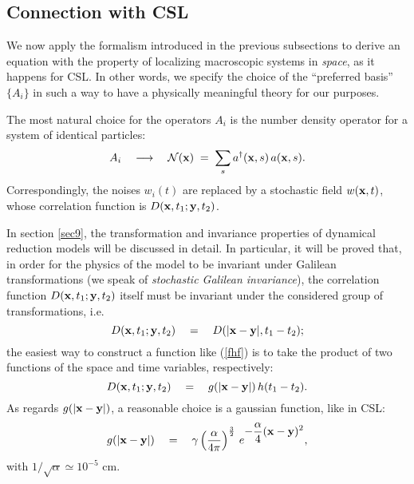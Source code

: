 \documentclass[10pt,a4paper]{article}
\begin{document}
\subsection{Connection with CSL} \label{nsec5}

We now apply the formalism introduced in the previous subsections
to derive an equation with the property of localizing macroscopic
systems in {\it space}, as it happens for CSL. In other words, we specify
the choice of the ``preferred basis'' $\{ A_{i} \}$ in such a way
to have a physically meaningful theory for our purposes.

The most natural choice for the operators $A_{i}$ is the number
density operator for a system of identical particles:
\begin{equation}
A_{i} \quad \longrightarrow \quad {\mathcal N}({\bf x}) \; = \;
\sum_{s} a^{\dagger}({\bf x}, s)\,a({\bf x}, s).
\end{equation}
Correspondingly, the noises $w_{i}(t)$ are replaced by a
stochastic field $w({\bf x}, t)$, whose correlation function is
$D({\bf x}, t_{1}; {\bf y}, t_{2})$.

In section \ref{sec9}, the transformation and invariance
properties of dynamical reduction models will be discussed in
detail. In particular, it will be proved that, in order for the
physics of the model to be invariant under Galilean
transformations (we speak of {\it stochastic Galilean
invariance}), the correlation function $D({\bf x}, t_{1}; {\bf y},
t_{2})$ itself must be invariant under the considered group of
transformations, i.e.
\begin{equation} \label{fhf}
D({\bf x}, t_{1}; {\bf y}, t_{2}) \quad = \quad D(|{\bf x} - {\bf
y}|, t_{1}- t_{2});
\end{equation}
the easiest way to construct a function like (\ref{fhf}) is to
take the product of two functions of the space and time variables,
respectively:
\begin{equation}
D({\bf x}, t_{1}; {\bf y}, t_{2}) \quad = \quad g(|{\bf x} - {\bf
y}|)\, h(t_{1} - t_{2}).
\end{equation}
As regards $g(|{\bf x} - {\bf y}|)$, a reasonable choice is a
gaussian function, like in CSL:
\begin{equation}
g(|{\bf x} - {\bf y}|) \quad = \quad \gamma
\left(\frac{\alpha}{4\pi}\right)^{\frac{3}{2}}\, e^{\displaystyle
- \frac{\alpha}{4} ({\bf x} - {\bf y})^{2}},
\end{equation}
with $1/\sqrt{\alpha} \simeq 10^{-5}$ cm.
\end{document}
